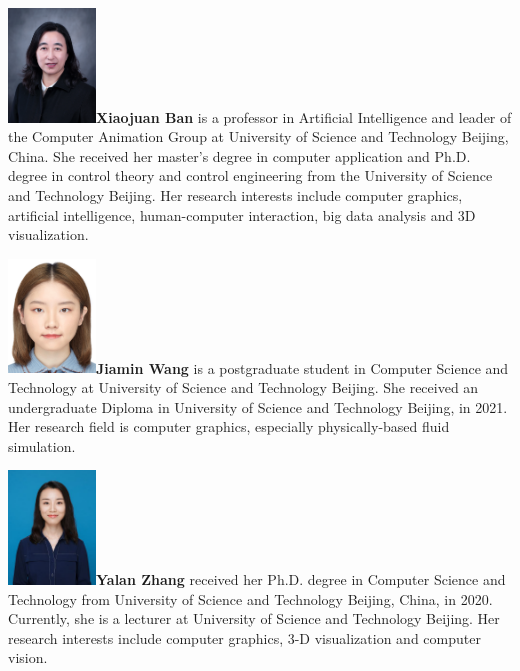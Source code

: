 \documentclass[VANCOUVER,STIX1COL]{WileyNJD-v2}
\begin{document}
\vspace{4.15ex}

\begin{biography}{\includegraphics[width=66pt,height=86pt]{VANCOUVER/figure/photos/XiaojuanBan.png}}{\textbf{Xiaojuan Ban} is a professor in Artificial Intelligence and leader of the Computer Animation Group at University of Science and Technology Beijing, China. She received her master's degree in computer application and Ph.D. degree in control theory and control engineering from the University of Science and Technology Beijing. Her research interests include computer graphics, artificial intelligence, human-computer interaction, big data analysis and 3D visualization.}
\end{biography}

\vspace{1.3ex}

\begin{biography}{\includegraphics[width=66pt,height=86pt]{VANCOUVER/figure/photos/JiaminWang.jpg}}{\textbf{Jiamin Wang} is a postgraduate student in Computer Science and Technology at University of Science and Technology Beijing. She received an undergraduate Diploma in University of Science and Technology Beijing, in 2021. Her research field is computer graphics, especially physically-based fluid simulation.}
\end{biography}

\vspace{7ex}

\begin{biography}{\includegraphics[width=66pt,height=86pt]{VANCOUVER/figure/photos/YalanZhang.jpg}}{\textbf{Yalan Zhang} received her Ph.D. degree in Computer Science and Technology from University of Science and Technology Beijing, China, in 2020. Currently, she is a lecturer at University of Science and Technology Beijing. Her research interests include computer graphics, 3-D visualization and computer vision.}
\end{biography}
\end{document}
